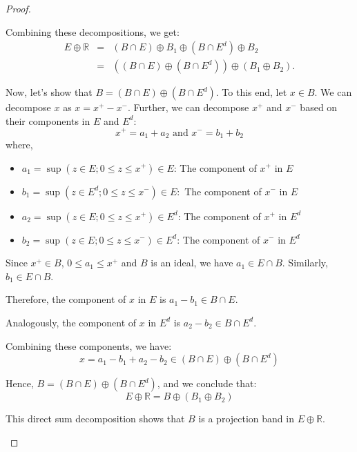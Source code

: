 \documentclass[10pt,a4paper]{amsart}
\begin{document}
\begin{proof}
\begin{enumerate}
		Combining these decompositions, we get:%
		\begin{eqnarray*}
			E\oplus 
			\mathbb{R}
			&=&\left( B\cap E\right) \oplus B_{1}\oplus \left( B\cap E^{d}\right) \oplus
			B_{2} \\
			&=&\left( \left( B\cap E\right) \oplus \left( B\cap E^{d}\right) \right)
			\oplus \left( B_{1}\oplus B_{2}\right) .
		\end{eqnarray*}
		
		Now, let's show that $B=\left( B\cap E\right) \oplus \left( B\cap
		E^{d}\right) .$ To this end, let $x\in B.$ We can decompose $x$ as $%
		x=x^{+}-x^{-}$. Further, we can decompose $x^{+}$ and $x^{-}$ based on their
		components in $E$ and $E^{d}:$%
		\begin{equation*}
			x^{+}=a_{1}+a_{2}\text{ and }x^{-}=b_{1}+b_{2}
		\end{equation*}
		where,
		
		
			\begin{itemize}
				\item $a_{1}=\sup \left( z\in E;0\leq z\leq x^{+}\right) \in E$: The
				component of $x^{+}$ in $E$
				
				\item $b_{1}=\sup \left( z\in E^{d};0\leq z\leq x^{-}\right) \in E:$ The
				component of $x^{-}$ in $E$
				
				\item $a_{2}=\sup \left( z\in E;0\leq z\leq x^{+}\right) \in E^{d}$: The
				component of $x^{+}$ in $E^{d}$
				
				\item $b_{2}=\sup \left( z\in E;0\leq z\leq x^{-}\right) \in E^{d}$: The
				component of $x^{-}$ in $E^{d}$
			\end{itemize}
	
		
		Since $x^{+}\in B$, $0\leq a_{1}\leq x^{+}$ and $B$ is an ideal, we have $%
		a_{1}\in E\cap B.$ Similarly, $b_{1}\in E\cap B.$ 
		
		Therefore,  the component of $x$ in $E$ is $a_{1}-b_{1}\in B\cap E.$
		
		Analogously,  the component of $x$ in $E^{d}$ is $a_{2}-b_{2}\in B\cap E^{d}.$
		
		Combining these components, we have:%
		\begin{equation*}
			x=a_{1}-b_{1}+a_{2}-b_{2}\in \left( B\cap E\right) \oplus \left( B\cap
			E^{d}\right) 
		\end{equation*}
		
	Hence, $B=\left( B\cap E\right) \oplus \left( B\cap E^{d}\right) $, and
		we conclude that:%
		\begin{equation*}
			E\oplus 
			\mathbb{R}
			=B\oplus \left( B_{1}\oplus B_{2}\right) 
		\end{equation*}
		
		This direct sum decomposition shows that $B$ is a projection band in $%
		E\oplus 
		\mathbb{R}
		$.
	\end{enumerate}
\end{proof}
\end{document}
